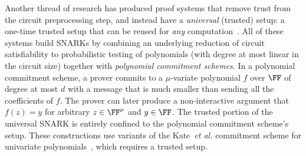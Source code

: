 Another thread of research has produced proof systems that remove trust from the circuit preprocessing step, and instead have a \emph{universal} (trusted) setup: a one-time trusted setup that can be reused for \emph{any} computation~\cite{Sonic,Libra,Spartan,Plonk}. All of these systems build SNARKs by combining an underlying reduction of circuit satisfiability to probabilistic testing of polynomials (with degree at most linear in the circuit size) together with \emph{polynomial commitment schemes}. In a polynomial commitment scheme, a prover commits to a $\mu$-variate polynomial $f$ over $\FF$ of degree at most $d$ with a message that is much smaller than sending all the coefficients of $f$. The prover can later produce a non-interactive argument that $f(z) = y$ for arbitrary $z \in \FF^\mu$ and $y \in \FF$. %
The trusted portion of the universal SNARK is entirely confined to the polynomial commitment scheme's setup. These constructions use variants of the Kate~\emph{et al.} commitment scheme for univariate polynomials~\cite{AC:KatZavGol10}, which requires a trusted setup.%


